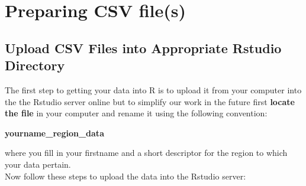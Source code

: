 \documentclass{article}\usepackage[]{graphicx}\usepackage[]{color}
\begin{document}
\section{Preparing CSV file(s)}

\subsection{Upload CSV Files into Appropriate Rstudio Directory} 
The first step to getting your data into R is to upload it from your computer into the the Rstudio server online but to simplify our work in the future first \textbf{locate the file} in your computer and rename it using the following convention: \\ 
\begin{center}
\textbf{yourname\_region\_data}
\end{center}
where you fill in your firstname and a short descriptor for the region to which your data pertain. \\

Now follow these steps to upload the data into the Rstudio server:
\end{document}

